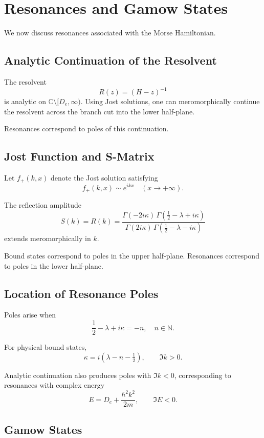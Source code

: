 \documentclass[11pt]{article}
\begin{document}
\section{Resonances and Gamow States}

We now discuss resonances associated with the Morse Hamiltonian.

\subsection{Analytic Continuation of the Resolvent}

The resolvent
\[
R(z)=(H-z)^{-1}
\]
is analytic on $\mathbb C\setminus[D_e,\infty)$.
Using Jost solutions, one can meromorphically continue
the resolvent across the branch cut into the lower half-plane.

Resonances correspond to poles of this continuation.

\subsection{Jost Function and S-Matrix}

Let $f_+(k,x)$ denote the Jost solution satisfying
\[
f_+(k,x)\sim e^{ikx}
\quad (x\to+\infty).
\]

The reflection amplitude
\[
S(k)=R(k)
=
\frac{\Gamma(-2i\kappa)
\,\Gamma(\frac12-\lambda+i\kappa)}
{\Gamma(2i\kappa)
\,\Gamma(\frac12-\lambda-i\kappa)}
\]
extends meromorphically in $k$.

Bound states correspond to poles in the upper half-plane.
Resonances correspond to poles in the lower half-plane.

\subsection{Location of Resonance Poles}

Poles arise when
\[
\frac12-\lambda+i\kappa=-n,
\quad n\in\mathbb N.
\]

For physical bound states,
\[
\kappa=i(\lambda-n-\tfrac12), \qquad \Im k>0.
\]

Analytic continuation also produces poles with $\Im k<0$,
corresponding to resonances with complex energy
\begin{equation}
E= D_e + \frac{\hbar^2 k^2}{2m},
\qquad \Im E<0.
\end{equation}

\subsection{Gamow States}
\end{document}
